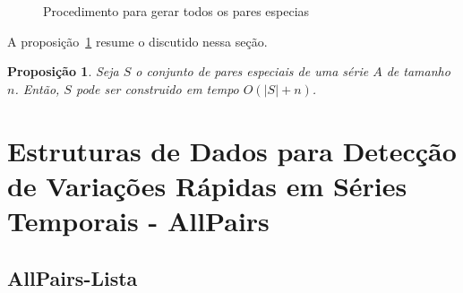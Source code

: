\documentclass[12pt]{article}
\newtheorem{prop}[thm]{Proposição}
\begin{document}
\begin{figure}

\caption{Procedimento para gerar todos os pares especias}
\label{fig:GenSpecialPairs}
\end{figure}


A proposição~\ref{genspecialpairs} resume o discutido nessa seção. 

\begin{prop}
Seja $S$ o conjunto de pares especiais de uma série $A$ de tamanho $n$. Então, 
$S$ pode ser construido em tempo $O(|S| + n)$.
\label{genspecialpairs}
\end{prop}

\section{Estruturas de Dados para Detecção de Variações Rápidas em Séries Temporais - AllPairs}

\subsection{AllPairs-Lista}
\end{document}
